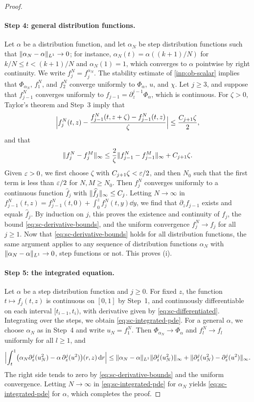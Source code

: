 \begin{proof}
\paragraph{Step 4: general distribution functions.}
Let $\alpha$ be a distribution function, and let $\alpha_N$ be step
distribution functions such that $\lVert \alpha_N-\alpha\rVert_{L^1}\to0$; for
instance, $\alpha_N(t)=\alpha((k+1)/N)$ for $k/N\le t<(k+1)/N$ and
$\alpha_N(1)=1$, which converges to $\alpha$ pointwise by right continuity.
We write $f_j^N=f_j^{\alpha_N}$. The stability estimate of
\cref{inp:ob-scalar} implies that $\Phi_{\alpha_N}$, $f_1^N$, and $f_2^N$
converge uniformly to $\Phi_\alpha$, $u$, and $\chi$. Let $j\ge3$, and suppose that
$f_{j-1}^N$ converges uniformly to $f_{j-1}=\partial_z^{j-1}\Phi_\alpha$,
which is continuous. For $\zeta>0$, Taylor's theorem and Step~3 imply
that
\[
 \Bigl|f_j^N(t,z)-\frac{f_{j-1}^N(t,z+\zeta)-f_{j-1}^N(t,z)}\zeta\Bigr|
 \le\frac{C_{j+1}\zeta}2,
\]
and that
\[
 \lVert f_j^N-f_j^M\rVert_\infty
 \le\frac2\zeta\lVert f_{j-1}^N-f_{j-1}^M\rVert_\infty+C_{j+1}\zeta.
\]
Given $\varepsilon>0$, we first choose $\zeta$ with $C_{j+1}\zeta<\varepsilon/2$, and then
$N_0$
such that the first term is less than $\varepsilon/2$ for $N,M\ge N_0$. Then
$f_j^N$ converges uniformly to a continuous function $\widehat f_j$ with
$\lVert \widehat f_j\rVert_\infty\le C_j$. Letting $N\to\infty$ in
$f_{j-1}^N(t,z)=f_{j-1}^N(t,0)+\int_0^zf_j^N(t,y)\dd y$, we find that
$\partial_zf_{j-1}$ exists and equals $\widehat f_j$. By induction on $j$, this proves
the existence and continuity of $f_j$, the bound
\eqref{eq:sc-derivative-bounds}, and the uniform convergence
$f_j^N\to f_j$ for all $j\ge1$. Now that \eqref{eq:sc-derivative-bounds}
holds for all distribution functions, the same argument applies to any
sequence of distribution functions $\alpha_N$ with
$\lVert \alpha_N-\alpha\rVert_{L^1}\to0$, step functions or not. This proves (i).

\paragraph{Step 5: the integrated equation.}
Let $\alpha$ be a step distribution function and $j\ge0$. For fixed $z$, the
function $t\mapsto f_j(t,z)$ is continuous on $[0,1]$ by Step~1, and
continuously differentiable on each interval $[t_{i-1},t_i)$, with derivative
given by \eqref{eq:sc-differentiated}. Integrating over the steps, we obtain
\eqref{eq:sc-integrated-pde}. For a general $\alpha$, we choose $\alpha_N$ as
in Step~4 and write $u_N=f_1^N$. Then $\Phi_{\alpha_N}\to\Phi_\alpha$ and
$f_l^N\to f_l$ uniformly for all $l\ge1$, and
\[
 \Bigl|\int_t^1\bigl(\alpha_N\partial_z^j(u_N^2)-\alpha\,\partial_z^j(u^2)\bigr)
   (r,z)\,\mathrm d r\Bigr|
 \le\lVert \alpha_N-\alpha\rVert_{L^1}\lVert \partial_z^j(u_N^2)\rVert_\infty
   +\lVert \partial_z^j(u_N^2)-\partial_z^j(u^2)\rVert_\infty.
\]
The right side tends to zero by \eqref{eq:sc-derivative-bounds} and the
uniform convergence. Letting $N\to\infty$ in \eqref{eq:sc-integrated-pde}
for $\alpha_N$ yields \eqref{eq:sc-integrated-pde} for $\alpha$, which
completes the proof.
\end{proof}

